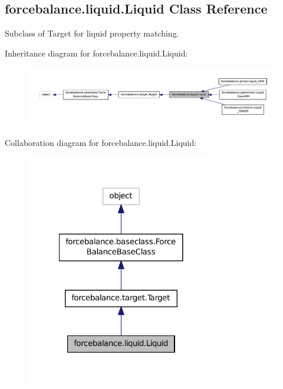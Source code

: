 \hypertarget{classforcebalance_1_1liquid_1_1Liquid}{\subsection{forcebalance.\-liquid.\-Liquid Class Reference}
\label{classforcebalance_1_1liquid_1_1Liquid}
}


Subclass of Target for liquid property matching.  




Inheritance diagram for forcebalance.\-liquid.\-Liquid\-:\nopagebreak
\begin{figure}[H]
\begin{center}
\leavevmode
\includegraphics[width=350pt]{classforcebalance_1_1liquid_1_1Liquid__inherit__graph}
\end{center}
\end{figure}


Collaboration diagram for forcebalance.\-liquid.\-Liquid\-:\nopagebreak
\begin{figure}[H]
\begin{center}
\leavevmode
\includegraphics[width=236pt]{classforcebalance_1_1liquid_1_1Liquid__coll__graph}
\end{center}
\end{figure}
